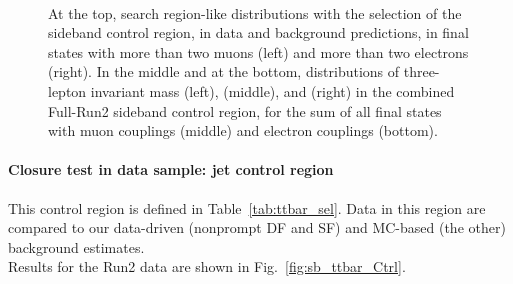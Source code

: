 \begin{figure}[h]
\noindent
  \\
  \caption{At the top, search region-like distributions with the selection of the
    sideband control region, in data and background
    predictions, in final states with more than two muons (left) and
    more than two electrons (right). In the middle and at the bottom, distributions of three-lepton invariant mass (left), \mtwol
    (middle), and \Deltwod (right) in the combined Full-Run2 sideband control region,
    for the sum of all final states with muon couplings (middle) and
    electron couplings (bottom).}
  \label{fig:sb_sr_Ctrl}
\end{figure}

\vspace{10cm}
\paragraph*{Closure test in data sample: \PQb jet control region}
This control region is defined in Table~\ref{tab:ttbar_sel}.
Data in this region are compared to our data-driven (nonprompt DF and
SF) and MC-based (the other) background estimates.\\
Results for the Run2 data  are shown in
Fig.~\ref{fig:sb_ttbar_Ctrl}.

